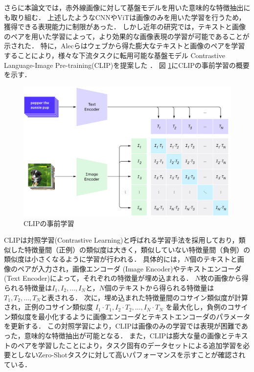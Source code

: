 \documentclass[a4paper,11pt,nomag]{jsreport}
\begin{document}
さらに本論文では，赤外線画像に対して基盤モデルを用いた意味的な特徴抽出にも取り組む．
上述したようなCNNやViTは画像のみを用いた学習を行うため，獲得できる表現能力に制限があった．
しかし近年の研究では，テキストと画像のペアを用いた学習によって，より効果的な画像表現の学習が可能であることが示された．
特に，Alecらはウェブから得た膨大なテキストと画像のペアを学習することにより，様々な下流タスクに転用可能な基盤モデル Contrastive Language-Image Pre-training(CLIP)を提案した \cite{clip}．
図 \ref{fig:clip-a}にCLIPの事前学習の概要を示す．
% 
\begin{figure}[tbp]
  \centering
  \includegraphics[width=\linewidth, keepaspectratio]{image/clip-a.png}
  \caption{CLIPの事前学習 \textcolor{red}{\cite{clip}}}
  \label{fig:clip-a}
\end{figure}
% 
CLIPは対照学習(Contrastive Learning)と呼ばれる学習手法を採用しており，類似した特徴量間（正例）の類似度は大きく，類似していない特徴量間（負例）の類似度は小さくなるように学習が行われる．
具体的には，$N$個のテキストと画像のペアが入力され，画像エンコーダ (Image Encoder)やテキストエンコーダ (Text Encoder)によって，それぞれの特徴量が埋め込まれる．
$N$枚の画像から得られる特徴量は$I_1, I_2, \ldots, I_N$と，$N$個のテキストから得られる特徴量は$T_1, T_2, \ldots, T_N$と表される．
次に，埋め込まれた特徴量間のコサイン類似度が計算され，正例のコサイン類似度 $I_1 \cdot T_1, I_2 \cdot T_2, \ldots, I_N \cdot T_N$ を最大化し，負例のコサイン類似度を最小化するように画像エンコーダとテキストエンコーダのパラメータを更新する．
この対照学習により，CLIPは画像のみの学習では表現が困難であった，意味的な特徴抽出が可能となる．
また，CLIPは膨大な量の画像とテキストのペアを学習したことにより，タスク固有のデータセットによる追加学習を必要としないZero-Shotタスクに対して高いパフォーマンスを示すことが確認されている．
\end{document}
